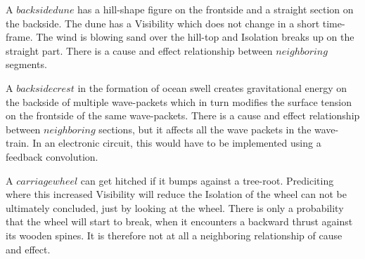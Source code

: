 \documentclass{report}
\begin{document}
A $backside dune$ has a hill-shape figure on the frontside and a straight section on the backside. The dune has a Visibility which does not change in a short time-frame. The wind is blowing sand over the hill-top and Isolation breaks up on the straight part. There is a cause and effect relationship between $neighboring$ segments.

A $backside crest$ in the formation of ocean swell creates gravitational energy on the backside of multiple wave-packets which in turn modifies the surface tension on the frontside of the same wave-packets. There is a cause and effect relationship between $neighboring$ sections, but it affects all the wave packets in the wave-train. In an electronic circuit, this would have to be implemented using a feedback convolution.

A $carriage wheel$ can get hitched if it bumps against a tree-root. Prediciting where this increased Visibility will reduce the Isolation of the wheel can not be ultimately concluded, just by looking at the wheel. There is only a probability that the wheel will start to break, when it encounters a backward thrust against its wooden spines. It is therefore not at all a neighboring relationship of cause and effect.
\end{document}
